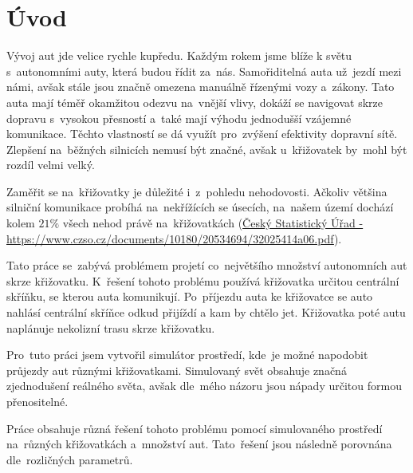 \chapter*{Úvod}\label{ch:uvod}

Vývoj aut jde velice rychle kupředu.
Každým rokem jsme blíže k světu s~autonomními auty, která budou řídit za~nás.
Samořiditelná auta už~jezdí mezi námi, avšak stále jsou značně omezena manuálně řízenými vozy a~zákony.
Tato auta mají téměř okamžitou odezvu na~vnější vlivy, dokáží se navigovat skrze dopravu s~vysokou přesností
a~také mají výhodu jednodušší vzájemné komunikace.
Těchto vlastností se dá využít pro~zvýšení efektivity dopravní sítě.
Zlepšení na~běžných silnicích nemusí být značné, avšak u~křižovatek by~mohl být rozdíl velmi velký.

Zaměřit se na~křižovatky je důležité i~z~pohledu nehodovosti.
Ačkoliv většina silniční komunikace probíhá na~nekřížících se úsecích, na~našem území dochází kolem $21\%$ všech nehod
právě na~křižovatkách (\href{https://www.czso.cz/documents/10180/20534694/32025414a06.pdf}
{Český Statistický Úřad - https://www.czso.cz/documents/10180/20534694/32025414a06.pdf}).

Tato práce se~zabývá problémem projetí co~největšího množství autonomních aut skrze křižovatku.
K~řešení tohoto problému používá křižovatka určitou centrální skříňku, se kterou auta komunikují.
Po~příjezdu auta ke křižovatce se auto nahlásí centrální skříňce odkud přijíždí a kam by chtělo jet.
Křižovatka poté autu naplánuje nekolizní trasu skrze křižovatku.

Pro~tuto práci jsem vytvořil simulátor prostředí, kde~je možné napodobit průjezdy aut různými křižovatkami.
Simulovaný svět obsahuje značná zjednodušení reálného světa, avšak dle~mého názoru jsou nápady určitou formou přenositelné.

Práce obsahuje různá řešení tohoto problému pomocí simulovaného prostředí na~různých křižovatkách a~množství aut.
Tato~řešení jsou následně porovnána dle~rozličných parametrů.
